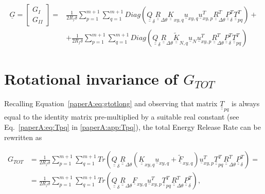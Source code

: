 \begin{equation}
\begin{split}
\underline{G}=\begin{bmatrix}
G_{I} \\
G_{II}
\end{bmatrix}=&\frac{1}{2R_{f}\delta}\sum_{p=1}^{m+1}\sum_{q=1}^{m+1}Diag\left(\underline{\underline{Q}}_{\delta}\underline{\underline{R}}_{\Delta\theta}\underline{\underline{K}}_{xy,q}\underline{u}_{xy,q}\underline{u}_{xy,p}^{T}\underline{\underline{R}}_{\Delta\theta}^{T}\underline{\underline{P}}_{\delta}^{T}\underline{\underline{T}}_{pq}^{T}\right)+\\
&+\frac{1}{2R_{f}\delta}\sum_{p=1}^{m+1}\sum_{q=1}^{m+1}Diag\left(\underline{\underline{Q}}_{\delta}\underline{\underline{R}}_{\Delta\theta}\underline{\underline{\widetilde{K}}}_{N,q}\underline{u}_{N}\underline{u}_{xy,p}^{T}\underline{\underline{R}}_{\Delta\theta}^{T}\underline{\underline{P}}_{\delta}^{T}\underline{\underline{T}}_{pq}^{T}\right)
\end{split}
\end{equation}

\section{Rotational invariance of $G_{TOT}$}

Recalling Equation~\ref{paperA:eq:gtotlong} and observing that matrix $\underline{\underline{T}}_{pq}$ is always equal to the identity matrix pre-multiplied by a suitable real constant (see Eq.~\ref{paperA:eq:Tpq} in \ref{paperA:app:Tpq}), the total Energy Release Rate can be rewritten as

\begin{equation}\label{paperA:eq:gtotlong1}
\begin{split}
G_{TOT}&=\frac{1}{2R_{f}\delta}\sum_{p=1}^{m+1}\sum_{q=1}^{m+1}Tr\left(\underline{\underline{Q}}_{\delta}\underline{\underline{R}}_{\Delta\theta}\left(\underline{\underline{K}}_{xy,q}\underline{u}_{xy,q}+\underline{\widetilde{F}}_{xy,q}\right)\underline{u}_{xy,p}^{T}\underline{\underline{T}}_{pq}^{T}\underline{\underline{R}}_{\Delta\theta}^{T}\underline{\underline{P}}_{\delta}^{T}\right)=\\
&=\frac{1}{2R_{f}\delta}\sum_{p=1}^{m+1}\sum_{q=1}^{m+1}Tr\left(\underline{\underline{Q}}_{\delta}\underline{\underline{R}}_{\Delta\theta}\underline{F}_{xy,q}\underline{u}_{xy,p}^{T}\underline{\underline{T}}_{pq}^{T}\underline{\underline{R}}_{\Delta\theta}^{T}\underline{\underline{P}}_{\delta}^{T}\right),
\end{split}
\end{equation}


